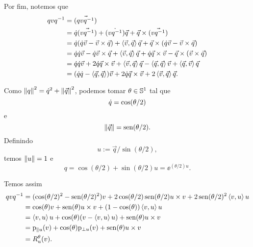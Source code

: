 Por fim, notemos que
	\begin{align*}
	qvq\inv &= \vec{(qvq\inv)} \\
		&= \esc{q}\vec{(vq\inv)}+\esc{(vq\inv)}\vec{q}+\vec{q} \times \vec{(vq\inv)} \\
		&= \esc{q}(\esc{q}\vec{v}-\vec{v}\times \vec{q})+\inte{\vec{v}}{\vec{q}}\vec{q}+\vec{q} \times (\esc{q}\vec{v}-\vec{v}\times \vec{q}) \\
		&= \esc{q}\esc{q}\vec{v}-\esc{q}\vec{v}\times \vec{q} + \inte{\vec{v}}{\vec{q}}\vec{q} + \esc{q} \vec{q} \times \vec{v} - \vec{q} \times (\vec{v}\times \vec{q}) \\
		&= \esc{q}\esc{q}\vec{v}+2\esc{q}\vec{q}\times \vec{v} + \inte{\vec{v}}{\vec{q}}\vec{q} - \inte{\vec{q}}{\vec{q}}\vec{v} + \inte{\vec{q}}{\vec{v}}\vec{q} \\
		&= (\esc{q}\esc{q} - \inte{\vec{q}}{\vec{q}})\vec{v}+2\esc{q}\vec{q}\times \vec{v} + 2\inte{\vec{v}}{\vec{q}}\vec{q}.
	\end{align*}
	
Como $\nor{q}^2 = \esc{q}^2 + \nor{\vec{q}}^2$, podemos tomar $\theta \in \S^1$ tal que
	\begin{equation*}
	\esc{q} = \cos(\theta/2)
	\end{equation*}
e
	\begin{equation*}
	\nor{\vec{q}} = \sin(\theta/2).
	\end{equation*}
Definindo
	\begin{equation*}
	u := \vec{q}/\sin(\theta/2),
	\end{equation*}
temos $\nor{u}=1$ e
	\begin{equation*}
	q=\cos(\theta/2)+\sin(\theta/2)u = \ee^{(\theta/2)u}.
	\end{equation*}

Temos assim
	\begin{align*}
	qvq\inv 
		&= (\cos(\theta/2)^2-\sin(\theta/2)^2)v + 2\cos(\theta/2)\sin(\theta/2){u \times v} + 2\sin(\theta/2)^2\inte{v}{u}u \\
		&= \cos(\theta) v + \sin(\theta) u \times v + (1-\cos(\theta))\inte{v}{u}u \\
		&= \inte{v}{u}u + \cos(\theta) (v-\inte{v}{u}u) + \sin(\theta) u \times v \\
		&= \proj_{\parallel u}(v) + \cos(\theta) \proj_{\perp u}(v) + \sin(\theta) u \times v \\
		&= R^\theta_u(v).
	\end{align*}

